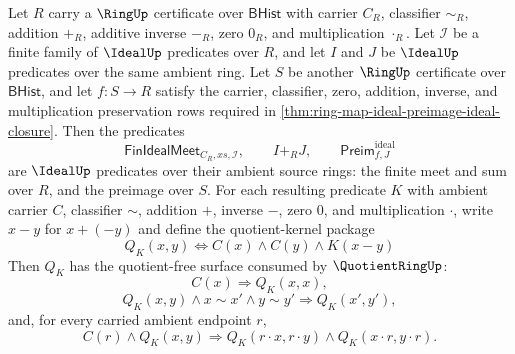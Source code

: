 \begin{theorem}
\label{thm:ideal-finite-meet-sum-preimage-lattice-surface}
Let $R$ carry a $\RingUp$ certificate over $\mathsf{BHist}$ with carrier $C_R$, classifier $\sim_R$, addition $+_R$, additive inverse $-_R$, zero $0_R$, and multiplication $\cdot_R$. Let $\mathcal{I}$ be a finite family of $\IdealUp$ predicates over $R$, and let $I$ and $J$ be $\IdealUp$ predicates over the same ambient ring. Let $S$ be another $\RingUp$ certificate over $\mathsf{BHist}$, and let $f:S\to R$ satisfy the carrier, classifier, zero, addition, inverse, and multiplication preservation rows required in \autoref{thm:ring-map-ideal-preimage-ideal-closure}. Then the predicates
$$
\mathsf{FinIdealMeet}_{C_R,xs,\mathcal{I}},\qquad
I+_RJ,\qquad
\mathsf{Preim}^{\mathrm{ideal}}_{f,J}
$$
are $\IdealUp$ predicates over their ambient source rings: the finite meet and sum over $R$, and the preimage over $S$. For each resulting predicate $K$ with ambient carrier $C$, classifier $\sim$, addition $+$, inverse $-$, zero $0$, and multiplication $\cdot$, write $x-y$ for $x+(-y)$ and define the quotient-kernel package
$$
Q_K(x,y)\Longleftrightarrow C(x)\land C(y)\land K(x-y)
$$
Then $Q_K$ has the quotient-free surface consumed by $\QuotientRingUp$:
$$
C(x)\Longrightarrow Q_K(x,x),
$$
$$
Q_K(x,y)\land x\sim x'\land y\sim y'\Longrightarrow Q_K(x',y'),
$$
and, for every carried ambient endpoint $r$,
$$
C(r)\land Q_K(x,y)
\Longrightarrow
Q_K(r\cdot x,r\cdot y)\land Q_K(x\cdot r,y\cdot r).
$$
\end{theorem}
